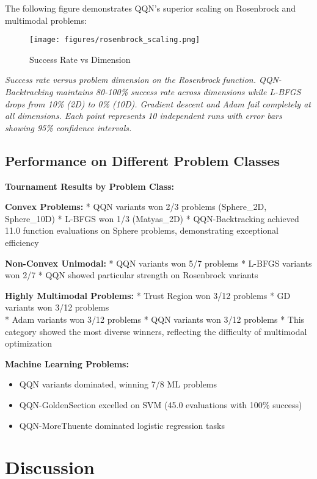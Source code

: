The following figure demonstrates QQN's superior scaling on Rosenbrock and multimodal problems:

\begin{figure}
\centering
\texttt{[image: figures/rosenbrock\_scaling.png]}
\caption{Success Rate vs Dimension}
\end{figure}

\emph{Success rate versus problem dimension on the Rosenbrock function. QQN-Backtracking maintains 80-100\% success rate across dimensions while L-BFGS drops from 10\% (2D) to 0\% (10D). Gradient descent and Adam fail completely at all dimensions. Each point represents 10 independent runs with error bars showing 95\% confidence intervals.}

\hypertarget{performance-on-different-problem-classes}{%
\subsection{Performance on Different Problem Classes}\label{performance-on-different-problem-classes}}

\textbf{Tournament Results by Problem Class:}

\textbf{Convex Problems:}
* QQN variants won 2/3 problems (Sphere\_2D, Sphere\_10D)
* L-BFGS won 1/3 (Matyas\_2D)
* QQN-Backtracking achieved 11.0 function evaluations on Sphere problems, demonstrating exceptional efficiency

\textbf{Non-Convex Unimodal:}
* QQN variants won 5/7 problems
* L-BFGS variants won 2/7
* QQN showed particular strength on Rosenbrock variants

\textbf{Highly Multimodal Problems:}
* Trust Region won 3/12 problems
* GD variants won 3/12 problems\\
* Adam variants won 3/12 problems
* QQN variants won 3/12 problems
* This category showed the most diverse winners, reflecting the difficulty of multimodal optimization

\textbf{Machine Learning Problems:}

\begin{itemize}
\tightlist
\item
  QQN variants dominated, winning 7/8 ML problems
\item
  QQN-GoldenSection excelled on SVM (45.0 evaluations with 100\% success)
\item
  QQN-MoreThuente dominated logistic regression tasks
\end{itemize}

\hypertarget{discussion}{%
\section{Discussion}\label{discussion}}

